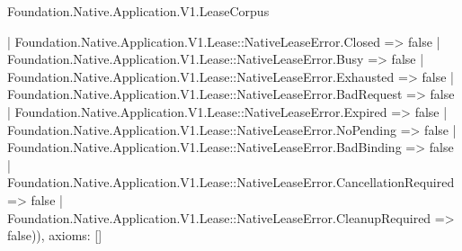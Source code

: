 \begin{lexlean}{Foundation.Native.Application.V1.LeaseCorpus}
\begin{semanticmodule}
{      | Foundation.Native.Application.V1.Lease::NativeLeaseError.Closed => false
      | Foundation.Native.Application.V1.Lease::NativeLeaseError.Busy => false
      | Foundation.Native.Application.V1.Lease::NativeLeaseError.Exhausted => false
      | Foundation.Native.Application.V1.Lease::NativeLeaseError.BadRequest => false
      | Foundation.Native.Application.V1.Lease::NativeLeaseError.Expired => false
      | Foundation.Native.Application.V1.Lease::NativeLeaseError.NoPending => false
      | Foundation.Native.Application.V1.Lease::NativeLeaseError.BadBinding => false
      | Foundation.Native.Application.V1.Lease::NativeLeaseError.CancellationRequired => false
      | Foundation.Native.Application.V1.Lease::NativeLeaseError.CleanupRequired => false)),
  axioms: []
}
\end{semanticmodule}
\end{lexlean}
